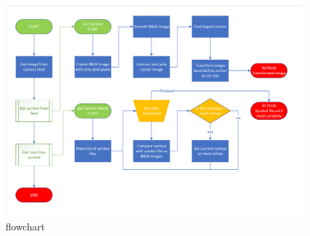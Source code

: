 \begin{figure}[h]%
	\centering
	\includegraphics[width = 1\textwidth]{"assets/symbol_detect_flowchart"}
	\caption{flowchart}
	\label{fig:symbol_detect_flowchart}
\end{figure}


